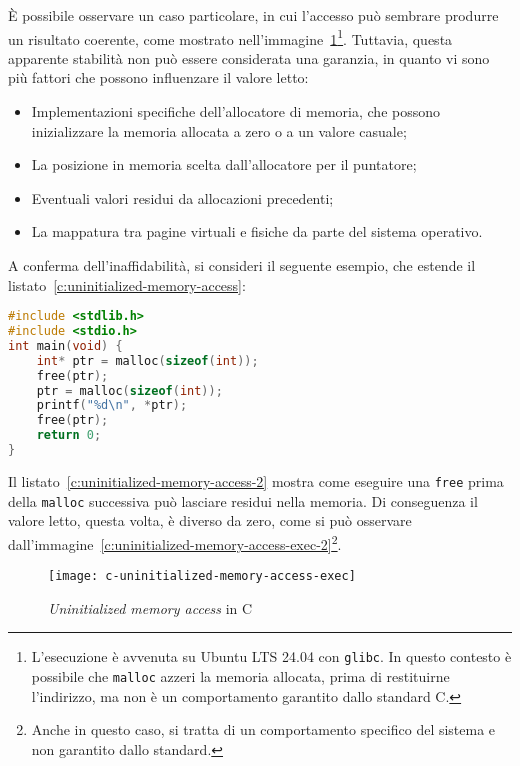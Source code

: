 È possibile osservare un caso particolare, in cui l'accesso può sembrare produrre un risultato coerente, come mostrato nell'immagine~\ref{c:uninitialized-memory-access-exec}\footnote{L'esecuzione è avvenuta su Ubuntu LTS 24.04 con \texttt{glibc}. In questo contesto è possibile che \texttt{malloc} azzeri la memoria allocata, prima di restituirne l'indirizzo, ma non è un comportamento garantito dallo standard C.}.
Tuttavia, questa apparente stabilità non può essere considerata una garanzia, in quanto vi sono più fattori che possono influenzare il valore letto:
\begin{itemize}
    \item Implementazioni specifiche dell'allocatore di memoria, che possono inizializzare la memoria allocata a zero o a un valore casuale;
    \item La posizione in memoria scelta dall'allocatore per il puntatore;
    \item Eventuali valori residui da allocazioni precedenti;
    \item La mappatura tra pagine virtuali e fisiche da parte del sistema operativo.
\end{itemize}
A conferma dell'inaffidabilità, si consideri il seguente esempio, che estende il listato~\ref{c:uninitialized-memory-access}: 
\begin{lstlisting}[language=C, caption={Uninitialized memory access in C}, label={c:uninitialized-memory-access-2}]
#include <stdlib.h>
#include <stdio.h>
int main(void) {
    int* ptr = malloc(sizeof(int));
    free(ptr);
    ptr = malloc(sizeof(int));
    printf("%d\n", *ptr);
    free(ptr);
    return 0;
}
\end{lstlisting}
Il listato~\ref{c:uninitialized-memory-access-2} mostra come eseguire una \texttt{free} prima della \texttt{malloc} successiva può lasciare residui nella memoria. 
Di conseguenza il valore letto, questa volta, è diverso da zero, come si può osservare dall'immagine~\ref{c:uninitialized-memory-access-exec-2}\footnote{Anche in questo caso, si tratta di un comportamento specifico del sistema e non garantito dallo standard.}.
\begin{figure}[htbp]
\begin{center}
    \texttt{[image: c-uninitialized-memory-access-exec]}
    \caption{\textit{Uninitialized memory access} in C}\label{c:uninitialized-memory-access-exec}
    \end{center}
\end{figure}

